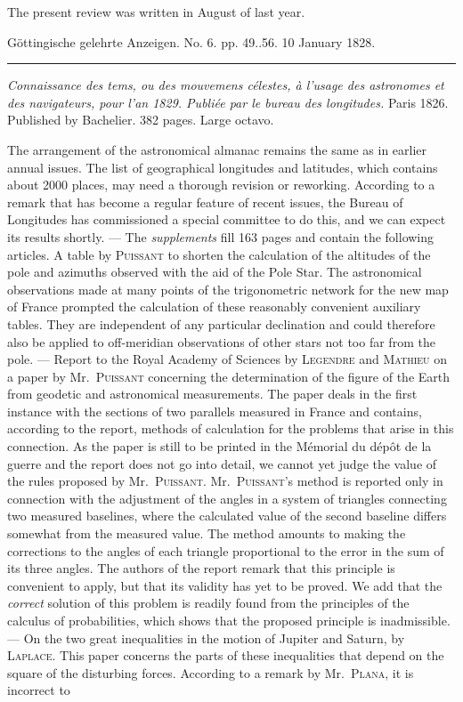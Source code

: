 \clearpage
{}
\hypertarget{native-650-lower}{}
\expandafter\def\csname HistoricalNoteText37\endcsname{The present review was written in August of last year.}
\begin{center}\small Göttingische gelehrte Anzeigen. No. 6. pp. 49..56. 10 January 1828.\\[3pt]\rule{.72\linewidth}{.3pt}\end{center}

\emph{Connaissance des tems, ou des mouvemens célestes, à l'usage des astronomes et des navigateurs, pour l'an \textup{1829}. Publiée par le bureau des longitudes.} Paris 1826. Published by Bachelier. 382 pages. Large octavo.

The arrangement of the astronomical almanac remains the same as in earlier annual issues. The list of geographical longitudes and latitudes, which contains about 2000 places, may need a thorough revision or reworking. According to a remark that has become a regular feature of recent issues, the Bureau of Longitudes has commissioned a special committee to do this, and we can expect its results shortly. --- The \emph{supplements} fill 163 pages and contain the following articles. A table by \textsc{Puissant} to shorten the calculation of the altitudes of the pole and azimuths observed with the aid of the Pole Star. The astronomical observations made at many points of the trigonometric network for the new map of France prompted the calculation of these reasonably convenient auxiliary tables. They are independent of any particular declination and could therefore also be applied to off-meridian observations of other stars not too far from the pole. --- Report to the Royal Academy of Sciences by \textsc{Legendre} and \textsc{Mathieu} on a paper by Mr.\ \textsc{Puissant} concerning the determination of the figure of the Earth from geodetic and astronomical measurements. The paper deals in the first instance with the sections of two parallels measured in France and contains, according to the report,  methods of calculation for the problems that arise in this connection. As the paper is still to be printed in the Mémorial du dépôt de la guerre and the report does not go into detail, we cannot yet judge the value of the rules proposed by Mr.\ \textsc{Puissant}. Mr.\ \textsc{Puissant}'s method is reported only in connection with the adjustment of the angles in a system of triangles connecting two measured baselines, where the calculated value of the second baseline differs somewhat from the measured value. The method amounts to making the corrections to the angles of each triangle proportional to the error in the sum of its three angles. The authors of the report remark that this principle is convenient to apply, but that its validity has yet to be proved. We add that the \emph{correct} solution of this problem is readily found from the principles of the calculus of probabilities, which shows that the proposed principle is inadmissible. --- On the two great inequalities in the motion of Jupiter and Saturn, by \textsc{Laplace}. This paper concerns the parts of these inequalities that depend on the square of the disturbing forces. According to a remark by Mr.\ \textsc{Plana}, it is incorrect to 
